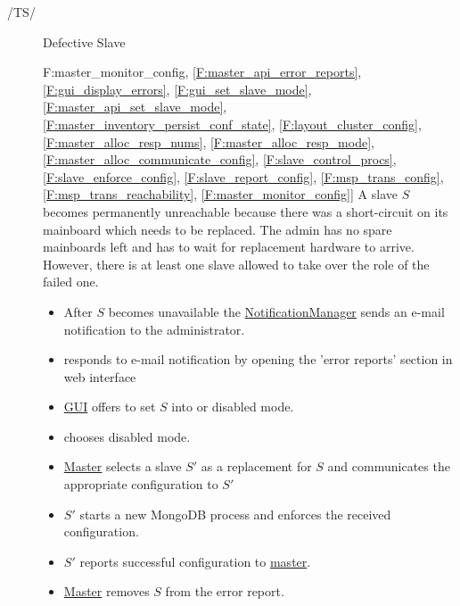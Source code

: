 \documentclass[a4paper, 11pt]{article}
\makeatletter
\def\namedlabel#1#2{\begingroup
    #2%
    \def\@currentlabel{#2}%
    \phantomsection\label{#1}\endgroup
}
\newcommand{\oitem}[2]{
  \@ifundefined{c@oitem#1}{\newcounter{oitem#1}}{} %
  \addtocounter{oitem#1}{10}
  \item[\namedlabel{#1:#2}{/#1\arabic{oitem#1}/}]
}
\newcommand{\testsequence}[3][]{
	\begin{description}[leftmargin=!,labelwidth=\widthof{\bfseries Preconditions}]
		\ifthenelse{\equal{#1}{}}
		{} %
		{\item[Tests] #1}
		\item[Preconditions] #2
		\item[Steps] #3
	\end{description}
}
\makeatother
\begin{document}
\begin{description}
\oitem{TS}{} Defective Slave
\testsequence
[\ref{F:master_monitor_config}, \ref{F:master_api_error_reports}, \ref{F:gui_display_errors}, \ref{F:gui_set_slave_mode}, \ref{F:master_api_set_slave_mode}, \ref{F:master_inventory_persist_conf_state}, \ref{F:layout_cluster_config}, \ref{F:master_alloc_resp_nums}, \ref{F:master_alloc_resp_mode}, \ref{F:master_alloc_communicate_config}, \ref{F:slave_control_procs}, \ref{F:slave_enforce_config}, \ref{F:slave_report_config}, \ref{F:msp_trans_config}, \ref{F:msp_trans_reachability}, \ref{F:master_monitor_config}]
{
	A \gls{slave} $S$ becomes permanently unreachable because there was a short-circuit on its mainboard which needs to be replaced. The admin has no spare mainboards left and has to wait for replacement hardware to arrive. However, there is at least one  \gls{slave} allowed to take over the role of the failed one.
}
{
	\begin{itemize}
		\item After $S$ becomes unavailable the \hyperref[SM:NotificationManager]{NotificationManager} sends an e-mail notification to the \gls{administrator}.
		\item {} responds to e-mail notification by opening the 'error reports' section in web interface %
		\item \hyperref[SM:GUI]{GUI} offers to set $S$ into  or \gls{disabled mode}.
		\item {} chooses \gls{disabled mode}.
		\item \hyperref[SM:Master]{Master} selects a \gls{slave} $S'$ as a replacement for $S$ and communicates the appropriate configuration to $S'$
		\item $S'$ starts a new \gls{MongoDB} process and enforces the received configuration.
		\item $S'$ reports successful configuration to \hyperref[SM:Master]{master}.
		\item \hyperref[SM:Master]{Master} removes $S$ from the error report.
	\end{itemize}
}



\end{description}
\end{document}
